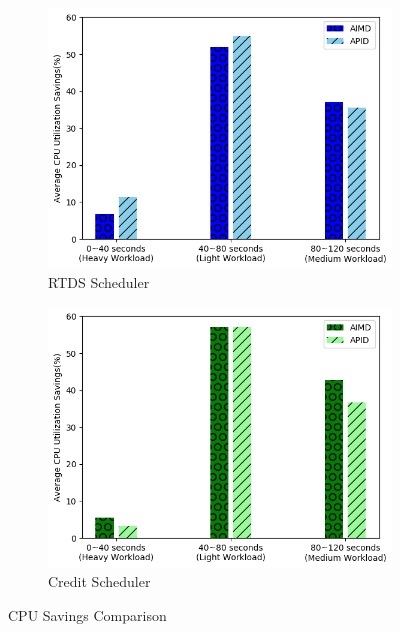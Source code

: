 \begin{itemize}
\begin{figure}[t!]
\centering
\begin{subfigure}{.42\textwidth}
    \centering
    \includegraphics[width=1\linewidth]{images/1vm_rtds_cpu}
    \caption{RTDS Scheduler}
    \label{1vm_rtds_cpu}
\end{subfigure}
\begin{subfigure}{.42\textwidth}
    \centering
    \includegraphics[width=1\linewidth]{images/1vm_credit_cpu}
    \caption{Credit Scheduler}
    \label{1vm_credit_cpu}
\end{subfigure}%
\captionsetup{justification=centering}
\caption{CPU Savings Comparison}
\label{1vm_rtdscredit_cpu}
\end{figure}




\end{itemize}





